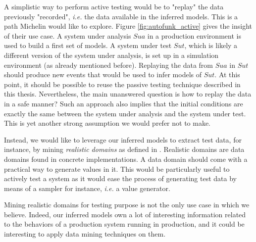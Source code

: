 A simplistic way to perform active testing would be to "replay"
\cite{thane2000using,Orso:2005:SCR:1082983.1083251} the data
previously "recorded", \emph{i.e.} the data available in the
inferred models. This is a path Michelin would like to explore.
Figure \ref{fig:autofunk_active} gives the insight of their use
case. A system under analysis $\mathit{Sua}$ in a production
environment is used to build a first set of models. A system
under test $\mathit{Sut}$, which is likely a different version of
the system under analysis, is set up in a simulation environment
(as already mentioned before).  Replaying the data from
$\mathit{Sua}$ in $\mathit{Sut}$ should produce new events that
would be used to infer models of $\mathit{Sut}$.  At this point,
it should be possible to reuse the passive testing technique
described in this thesis.  Nevertheless, the main unanswered
question is how to replay the data in a safe manner?  Such an
approach also implies that the initial conditions are exactly the
same between the system under analysis and the system under test.
This is yet another strong assumption we would prefer not to
make.

Instead, we would like to leverage our inferred models to extract
test data, for instance, by mining \emph{realistic domains} as
defined in \cite{Enderlin:2011:PSL:2075545.2075551}. Realistic
domains are data domains found in concrete implementations. A
data domain should come with a practical way to generate values
in it. This would be particularly useful to actively test a
system as it would ease the process of generating test data by
means of a sampler for instance, \emph{i.e.} a value generator.

Mining realistic domains for testing purpose is not the only use
case in which we believe. Indeed, our inferred models own a lot
of interesting information related to the behaviors of a
production system running in production, and it could be
interesting to apply data mining techniques on them.\\

